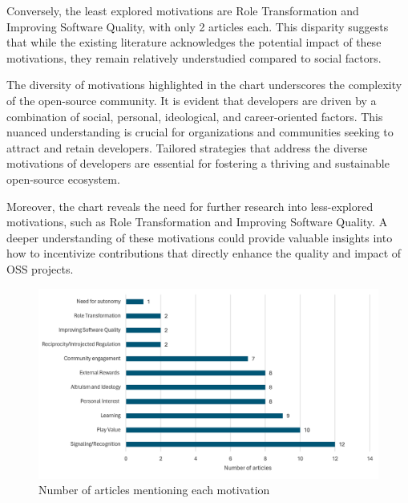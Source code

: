 Conversely, the least explored motivations are Role Transformation and Improving Software Quality, with only 2 articles each. This disparity suggests that while the existing literature acknowledges the potential impact of these motivations, they remain relatively understudied compared to social factors.

The diversity of motivations highlighted in the chart underscores the complexity of the open-source community. It is evident that developers are driven by a combination of social, personal, ideological, and career-oriented factors. This nuanced understanding is crucial for organizations and communities seeking to attract and retain developers. Tailored strategies that address the diverse motivations of developers are essential for fostering a thriving and sustainable open-source ecosystem.

Moreover, the chart reveals the need for further research into less-explored motivations, such as Role Transformation and Improving Software Quality. A deeper understanding of these motivations could provide valuable insights into how to incentivize contributions that directly enhance the quality and impact of OSS projects.

\begin{figure}[ht]
    \centering
    \includegraphics[width=1\linewidth]{figs/articleMotivationCount.png}
    \caption{Number of articles mentioning each motivation}
    \label{fig:articleMotivationCount}
\end{figure}

